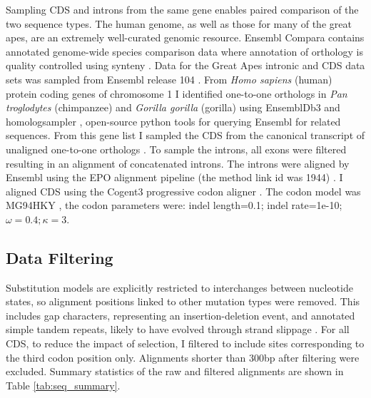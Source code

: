Sampling CDS and introns from the same gene enables paired comparison of the two sequence types. The human genome, as well as those for many of the great apes, are an extremely well-curated genomic resource. Ensembl Compara contains annotated genome-wide species comparison data where annotation of orthology is quality controlled using synteny \citep{Herrero2016EnsemblResources}. Data for the Great Apes intronic and CDS data sets was sampled from Ensembl release 104 \citep{Howe2021Ensembl2021}. From \textit{Homo sapiens} (human) protein coding genes of chromosome 1 I identified one-to-one orthologs in \textit{Pan troglodytes} (chimpanzee) and \textit{Gorilla gorilla} (gorilla) using EnsemblDb3 \citep{HuttleyEnsembldb3} and homologsampler \citep{HuttleyHomologsampler}, open-source python tools for querying Ensembl for related sequences. From this gene list I sampled the CDS from the canonical transcript of unaligned one-to-one orthologs \cite{Howe2021Ensembl2021}. To sample the introns, all exons were filtered resulting in an alignment of concatenated introns. The introns were aligned by Ensembl using the EPO alignment pipeline (the method link id was 1944) \citep{Howe2021Ensembl2021}. I aligned CDS using the Cogent3 progressive codon aligner \citep{Knight2007PyCogent:Sequence}. The codon model was MG94HKY \citep{Muse1994AGenome}, the codon parameters were: indel length=0.1; indel rate=1e-10; $\omega=0.4; \kappa=3$. 

\subsection{Data Filtering}
\label{Data Filtering}

Substitution models are explicitly restricted to interchanges between nucleotide states, so alignment positions linked to other mutation types were removed. This includes gap characters, representing an insertion-deletion event, and annotated simple tandem repeats, likely to have evolved through strand slippage \citep{Levinson1987Slipped-strandEvolution}. For all CDS, to reduce the impact of selection, I filtered to include sites corresponding to the third codon position only. Alignments shorter than $300$bp after filtering were excluded. Summary statistics of the raw and filtered alignments are shown in Table \ref{tab:seq_summary}. 



